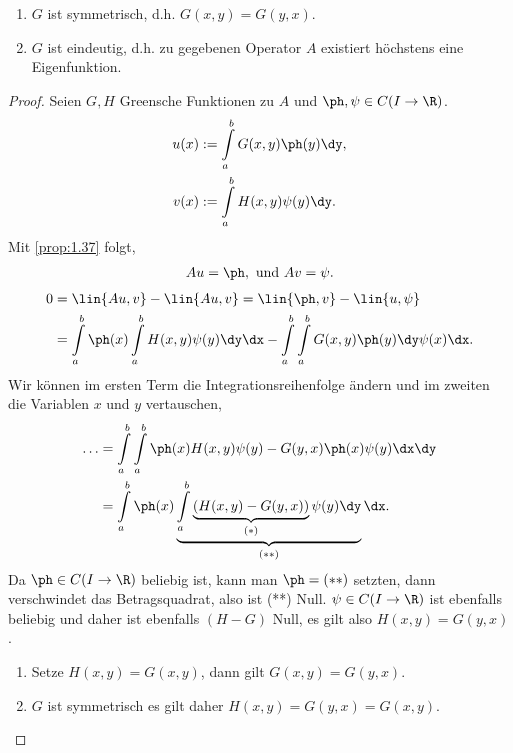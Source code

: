 \begin{prop}
\label{prop:1.38}
\begin{enumerate}[label=(\roman{*})]
  \item $G$ ist symmetrisch, d.h. $G(x,y)=G(y,x)$.
  \item $G$ ist eindeutig, d.h. zu gegebenen Operator $A$ existiert höchstens
  eine Eigenfunktion.\fishhere
\end{enumerate}
\end{prop}
\begin{proof}
Seien $G,H$ Greensche Funktionen zu $A$ und $\ph,\psi\in C(I\to\R)$.
\begin{align*}
u(x) &:= \int\limits_a^b G(x,y)\ph(y)\dy,\\
v(x) &:= \int\limits_a^b H(x,y)\psi(y)\dy.
\end{align*}
Mit \ref{prop:1.37} folgt,
\begin{align*}
Au = \ph,\text{ und } Av = \psi.
\end{align*}
\begin{align*}
0 &= \lin{Au,v} - \lin{Au,v} = \lin{\ph,v} - \lin{u,\psi}
\\ &= \int\limits_a^b \ph(x)\int\limits_a^b H(x,y)\psi(y)\dy \dx
- \int\limits_a^b \int\limits_a^b G(x,y)\ph(y)\dy \psi(x)\dx.
\end{align*}
Wir können im ersten Term die Integrationsreihenfolge ändern und im zweiten die
Variablen $x$ und $y$ vertauschen,
\begin{align*}
\ldots &= \int\limits_a^b\int\limits_a^b \ph(x)H(x,y)\psi(y) -
G(y,x)\ph(x)\psi(y)\dx\dy
\\ &= \int\limits_a^b \ph(x)\underbrace{\int\limits_a^b
\underbrace{\left(H(x,y)-G(y,x)\right)}_{(*)}\psi(y)\dy}_{(**)}\dx.
\end{align*}
Da $\ph\in C(I\to\R)$ beliebig ist, kann man 
$\ph=(**)$ setzten, dann verschwindet das Betragsquadrat, also ist (**) Null.
$\psi\in C(I\to\R)$ ist ebenfalls beliebig und daher ist ebenfalls $(H-G)$
Null, es gilt also $H(x,y) = G(y,x)$.
\begin{enumerate}[label=(\roman{*})]
  \item Setze $H(x,y)=G(x,y)$, dann gilt $G(x,y)=G(y,x)$.
  \item $G$ ist symmetrisch es gilt daher $H(x,y) = G(y,x) = G(x,y)$.\qedhere
\end{enumerate}
\end{proof}

